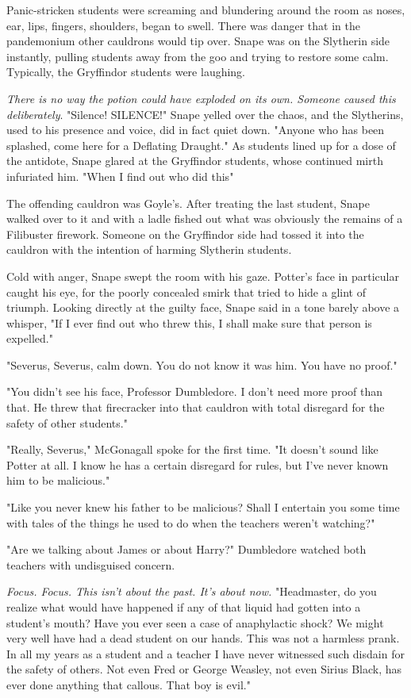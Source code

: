 Panic-stricken students were screaming and blundering around the room as noses, ear, lips, fingers, shoulders, began to swell. There was danger that in the pandemonium other cauldrons would tip over. Snape was on the Slytherin side instantly, pulling students away from the goo and trying to restore some calm. Typically, the Gryffindor students were laughing.

\emph{There is no way the potion could have exploded on its own. Someone caused this deliberately}. "Silence! SILENCE!" Snape yelled over the chaos, and the Slytherins, used to his presence and voice, did in fact quiet down. "Anyone who has been splashed, come here for a Deflating Draught." As students lined up for a dose of the antidote, Snape glared at the Gryffindor students, whose continued mirth infuriated him. "When I find out who did this{\el}"

The offending cauldron was Goyle's. After treating the last student, Snape walked over to it and with a ladle fished out what was obviously the remains of a Filibuster firework. Someone on the Gryffindor side had tossed it into the cauldron with the intention of harming Slytherin students.

Cold with anger, Snape swept the room with his gaze. Potter's face in particular caught his eye, for the poorly concealed smirk that tried to hide a glint of triumph. Looking directly at the guilty face, Snape said in a tone barely above a whisper, "If I ever find out who threw this, I shall make sure that person is expelled."

"Severus, Severus, calm down. You do not know it was him. You have no proof."

"You didn't see his face, Professor Dumbledore. I don't need more proof than that. He threw that firecracker into that cauldron with total disregard for the safety of other students."

"Really, Severus," McGonagall spoke for the first time. "It doesn't sound like Potter at all. I know he has a certain disregard for rules, but I've never known him to be malicious."

"Like you never knew his father to be malicious? Shall I entertain you some time with tales of the things he used to do when the teachers weren't watching?"

"Are we talking about James or about Harry?" Dumbledore watched both teachers with undisguised concern.

\emph{Focus. Focus. This isn't about the past. It's about now.} "Headmaster, do you realize what would have happened if any of that liquid had gotten into a student's mouth? Have you ever seen a case of anaphylactic shock? We might very well have had a dead student on our hands. This was not a harmless prank. In all my years as a student and a teacher I have never witnessed such disdain for the safety of others. Not even Fred or George Weasley, not even Sirius Black, has ever done anything that callous. That boy is evil."

